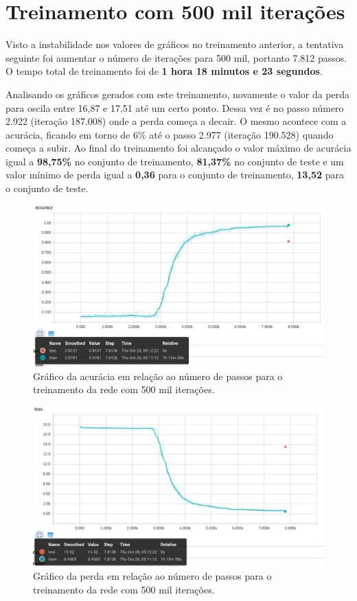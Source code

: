 \section{Treinamento com 500 mil iterações}

Visto a instabilidade nos valores de gráficos no treinamento anterior,
a tentativa seguinte foi aumentar o número de iterações para 500 mil,
portanto 7.812 passos. O tempo total de treinamento foi de {\bf 1 hora
18 minutos e 23 segundos}.

Analisando os gráficos gerados com este treinamento, novamente o valor
da perda para oscila entre 16,87 e 17,51 até um certo ponto. Dessa vez
é no passo número 2.922 (iteração 187.008) onde a perda começa a
decair. O mesmo acontece com a acurácia, ficando em torno de 6\% até o
passo 2.977 (iteração 190.528) quando começa a subir. Ao final do
treinamento foi alcançado o valor máximo de acurácia igual a {\bf
  98,75\%} no conjunto de treinamento, {\bf 81,37\%} no conjunto de
teste e um valor mínimo de perda igual a {\bf 0,36} para o conjunto de
treinamento, {\bf 13,52} para o conjunto de teste.

\begin{figure}[H]
\centering
\includegraphics[scale=0.4]{imagens/accuracy_500k}
\caption{Gráfico da acurácia em relação ao número de passos para o
  treinamento da rede com 500 mil iterações.}
\label{fig:accuracy_500k}
\end{figure}

\begin{figure}[H]
\centering
\includegraphics[scale=0.4]{imagens/loss_500k}
\caption{Gráfico da perda em relação ao número de passos para o
  treinamento da rede com 500 mil iterações.}
\label{fig:loss_500k}
\end{figure}

